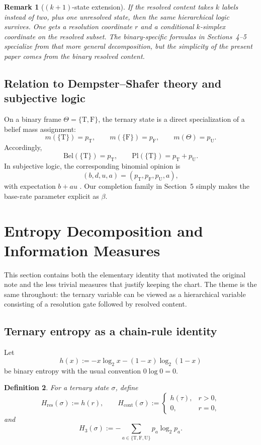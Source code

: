 \documentclass[11pt]{article}
\newtheorem{definition}{Definition}[section]
\newtheorem{remark}[definition]{Remark}
\newcommand{\T}{\mathrm{T}}
\newcommand{\F}{\mathrm{F}}
\newcommand{\U}{\mathrm{U}}
\newcommand{\1}{\mathbf{1}}
\newcommand{\hbin}{h}
\begin{document}
\begin{remark}[$(k+1)$-state extension]
If the resolved content takes $k$ labels instead of two, plus one unresolved state, then the same hierarchical logic survives. One gets a resolution coordinate $r$ and a conditional $k$-simplex coordinate on the resolved subset. The binary-specific formulas in Sections~4--5 specialize from that more general decomposition, but the simplicity of the present paper comes from the binary resolved content.
\end{remark}

\subsection{Relation to Dempster--Shafer theory and subjective logic}

On a binary frame $\Theta=\{\T,\F\}$, the ternary state is a direct specialization of a belief mass assignment:
\begin{equation}
 m(\{\T\})=p_\T,
 \qquad
 m(\{\F\})=p_\F,
 \qquad
 m(\Theta)=p_\U.
 \label{eq:ds-map}
\end{equation}
Accordingly,
\[
\mathrm{Bel}(\{\T\})=p_\T,
\qquad
\mathrm{Pl}(\{\T\})=p_\T+p_\U.
\]
In subjective logic, the corresponding binomial opinion is
\[
(b,d,u,a)=(p_\T,p_\F,p_\U,a),
\]
with expectation $b+a u$ \citep{Josang16}. Our completion family in Section~5 simply makes the base-rate parameter explicit as $\beta$.

\section{Entropy Decomposition and Information Measures}

This section contains both the elementary identity that motivated the original note and the less trivial measures that justify keeping the chart. The theme is the same throughout: the ternary variable can be viewed as a hierarchical variable consisting of a resolution gate followed by resolved content.

\subsection{Ternary entropy as a chain-rule identity}

Let
\[
\hbin(x):=-x\log_2 x-(1-x)\log_2(1-x)
\]
be binary entropy with the usual convention $0\log 0=0$.

\begin{definition}
For a ternary state $\sigma$, define
\[
H_{\mathrm{res}}(\sigma):=\hbin(r),
\qquad
H_{\mathrm{cont}}(\sigma):=
\begin{cases}
\hbin(\tau), & r>0,\\
0, & r=0,
\end{cases}
\]
and
\[
H_3(\sigma):=-\sum_{a\in\{\T,\F,\U\}} p_a\log_2 p_a.
\]
\end{definition}
\end{document}
